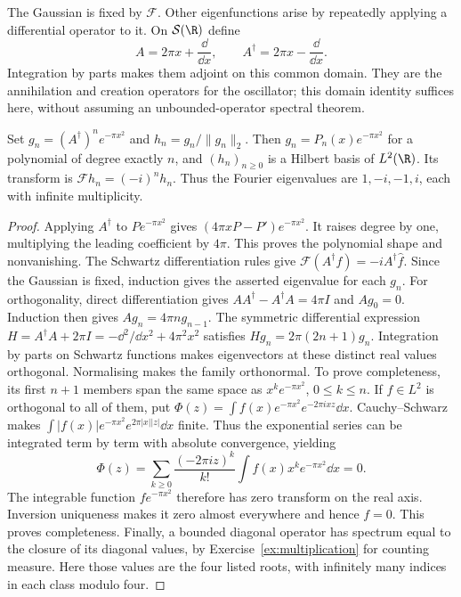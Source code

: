 The Gaussian is fixed by $\mathcal F$. Other eigenfunctions arise by repeatedly applying a differential operator to it. On $\mathcal S(\R)$ define
\[
A=2\pi x+\frac{\dd}{\dd x},\qquad
A^\dagger=2\pi x-\frac{\dd}{\dd x}.
\]
Integration by parts makes them adjoint on this common domain. They are the annihilation and creation operators for the oscillator; this domain identity suffices here, without assuming an unbounded-operator spectral theorem.

\begin{theorem}\label{thm:hermite}
Set $g_n=(A^\dagger)^ne^{-\pi x^2}$ and $h_n=g_n/\|g_n\|_2$. Then $g_n=P_n(x)e^{-\pi x^2}$ for a polynomial of degree exactly $n$, and $(h_n)_{n\ge0}$ is a Hilbert basis of $L^2(\R)$. Its transform is
$\mathcal Fh_n=(-i)^nh_n$.
Thus the Fourier eigenvalues are $1,-i,-1,i$, each with infinite multiplicity.
\end{theorem}
\begin{proof}
Applying $A^\dagger$ to $Pe^{-\pi x^2}$ gives $(4\pi xP-P')e^{-\pi x^2}$. It raises degree by one, multiplying the leading coefficient by $4\pi$. This proves the polynomial shape and nonvanishing.
The Schwartz differentiation rules give $\mathcal F(A^\dagger f)=-iA^\dagger\hat f$. Since the Gaussian is fixed, induction gives the asserted eigenvalue for each $g_n$.
For orthogonality, direct differentiation gives $AA^\dagger-A^\dagger A=4\pi I$ and $Ag_0=0$. Induction then gives $Ag_n=4\pi n g_{n-1}$. The symmetric differential expression
$H=A^\dagger A+2\pi I=-\dd^2/\dd x^2+4\pi^2x^2$
satisfies $Hg_n=2\pi(2n+1)g_n$. Integration by parts on Schwartz functions makes eigenvectors at these distinct real values orthogonal. Normalising makes the family orthonormal.
To prove completeness, its first $n+1$ members span the same space as $x^ke^{-\pi x^2}$, $0\le k\le n$. If $f\in L^2$ is orthogonal to all of them, put
$\Phi(z)=\int f(x)e^{-\pi x^2}e^{-2\pi ixz}\dd x$.
Cauchy--Schwarz makes $\int|f(x)|e^{-\pi x^2}e^{2\pi|x||z|}\dd x$ finite. Thus the exponential series can be integrated term by term with absolute convergence, yielding
\[
\Phi(z)=\sum_{k\ge0}\frac{(-2\pi iz)^k}{k!}
\int f(x)x^ke^{-\pi x^2}\dd x=0.
\]
The integrable function $fe^{-\pi x^2}$ therefore has zero transform on the real axis. Inversion uniqueness makes it zero almost everywhere and hence $f=0$. This proves completeness. Finally, a bounded diagonal operator has spectrum equal to the closure of its diagonal values, by Exercise~\ref{ex:multiplication} for counting measure. Here those values are the four listed roots, with infinitely many indices in each class modulo four.
\end{proof}

